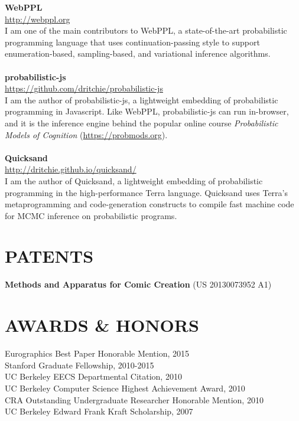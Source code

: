 \documentclass[line,margin]{res}
\begin{document}
\begin{resume}
\textbf{WebPPL} \\
\url{http://webppl.org} \\
I am one of the main contributors to WebPPL, a state-of-the-art probabilistic programming language that uses continuation-passing style to support enumeration-based, sampling-based, and variational inference algorithms.
\\ \\
\textbf{probabilistic-js} \\
\url{https://github.com/dritchie/probabilistic-js} \\
I am the author of probabilistic-js, a lightweight embedding of probabilistic programming in Javascript. Like WebPPL, probabilistic-js can run in-browser, and it is the inference engine behind the popular online course \emph{Probabilistic Models of Cognition} (\url{https://probmods.org}).
\\ \\
\textbf{Quicksand} \\
\url{http://dritchie.github.io/quicksand/} \\
I am the author of Quicksand, a lightweight embedding of probabilistic programming in the high-performance Terra language. Quicksand uses Terra's metaprogramming and code-generation constructs to compile fast machine code for MCMC inference on probabilistic programs.


\section{PATENTS}

\textbf{Methods and Apparatus for Comic Creation} (US 20130073952 A1)

\section{AWARDS \& HONORS}
Eurographics Best Paper Honorable Mention, 2015 \\
Stanford Graduate Fellowship, 2010-2015 \\ 
UC Berkeley EECS Departmental Citation, 2010 \\
UC Berkeley Computer Science Highest Achievement Award, 2010 \\
CRA Outstanding Undergraduate Researcher Honorable Mention, 2010 \\
UC Berkeley Edward Frank Kraft Scholarship, 2007 \\



\end{resume}
\end{document}
